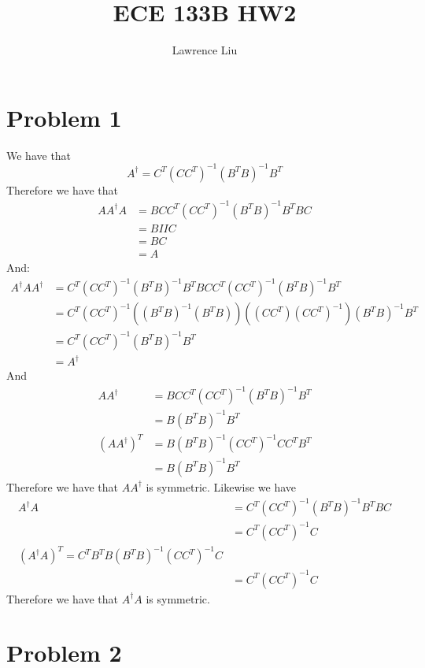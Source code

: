 \documentclass[11pt]{article}
\author{Lawrence Liu}
\title{ECE 133B HW2}
\begin{document}
\maketitle
\section{Problem 1}
We have that 
$$A^{\dagger} = C^T(CC^T)^{-1}(B^TB)^{-1}B^T$$
Therefore we have that 
\begin{align*}
    AA^{\dagger}A &= BC C^T(CC^T)^{-1}(B^TB)^{-1}B^T B C\\
    &=BIIC\\
    &=BC\\
    &=A
\end{align*}
And:
\begin{align*}
    A^{\dagger}AA^{\dagger} &= C^T(CC^T)^{-1}(B^TB)^{-1}B^T B C C^T(CC^T)^{-1}(B^TB)^{-1}B^T\\
    &= C^T(CC^T)^{-1} \left((B^TB)^{-1}(B^T B)\right) \left((C C^T)(CC^T)^{-1}\right) (B^TB)^{-1}B^T\\
    &= C^T(CC^T)^{-1}(B^TB)^{-1}B^T\\
    &= A^{\dagger}
\end{align*}
And 
\begin{align*}
    AA^{\dagger} &= BCC^T(CC^T)^{-1}(B^TB)^{-1}B^T \\
    &= B(B^TB)^{-1}B^T\\
    (AA^{\dagger})^T &=  B(B^TB)^{-1} (CC^T)^{-1} CC^T B^T \\
    &= B(B^TB)^{-1} B^T 
\end{align*}
Therefore we have that $AA^{\dagger}$ is symmetric. Likewise we have 
\begin{align*}
    A^{\dagger}A &= C^T(CC^T)^{-1}(B^TB)^{-1}B^T B C\\
     &= C^T(CC^T)^{-1} C\\
    (A^{\dagger}A)^T = C^T B^T B (B^TB)^{-1} (CC^T)^{-1} C\\
    &= C^T(CC^T)^{-1} C
\end{align*}
Therefore we have that $A^{\dagger}A$ is symmetric.
\section{Problem 2}
\end{document}
